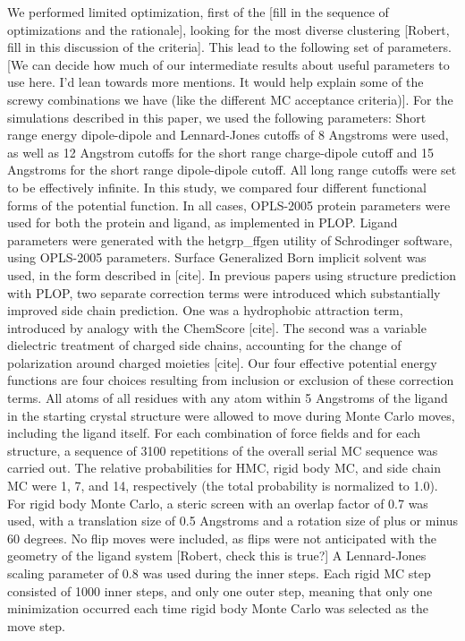 We performed limited optimization, first of the [fill in the sequence of optimizations and the rationale], looking for the most diverse clustering [Robert, fill in this discussion of the criteria].
This lead to the following set of parameters.
[We can decide how much of our intermediate results about useful parameters to use here.
I'd lean towards more mentions.
It would help explain some of the screwy combinations we have (like the different MC acceptance criteria)].
For the simulations described in this paper, we used the following parameters: Short range energy dipole-dipole and Lennard-Jones cutoffs of 8 Angstroms were used, as well as 12 Angstrom cutoffs for the short range charge-dipole cutoff and 15 Angstroms for the short range dipole-dipole cutoff.
All long range cutoffs were set to be effectively infinite.
In this study, we compared four different functional forms of the potential function.
In all cases, OPLS-2005 protein parameters were used for both the protein and ligand, as implemented in PLOP.
Ligand parameters were generated with the hetgrp\_ffgen utility of Schrodinger software, using OPLS-2005 parameters.
Surface Generalized Born implicit solvent was used, in the form described in [cite].
In previous papers using structure prediction with PLOP, two separate correction terms were introduced which substantially improved side chain prediction.
One was a hydrophobic attraction term, introduced by analogy with the ChemScore [cite].
The second was a variable dielectric treatment of charged side chains, accounting for the change of polarization around charged moieties [cite].
Our four effective potential energy functions are four choices resulting from inclusion or exclusion of these correction terms.
All atoms of all residues with any atom within 5 Angstroms of the ligand in the starting crystal structure were allowed to move during Monte Carlo moves, including the ligand itself.
For each combination of force fields and for each structure, a sequence of 3100 repetitions of the overall serial MC sequence was carried out.
The relative probabilities for HMC, rigid body MC, and side chain MC were 1, 7, and 14, respectively (the total probability is normalized to 1.0).
For rigid body Monte Carlo, a steric screen with an overlap factor of 0.7 was used, with a translation size of 0.5 Angstroms and a rotation size of plus or minus 60 degrees.
No flip moves were included, as flips were not anticipated with the geometry of the ligand system [Robert, check this is true?] A Lennard-Jones scaling parameter of 0.8 was used during the inner steps.
Each rigid MC step consisted of 1000 inner steps, and only one outer step, meaning that only one minimization occurred each time rigid body Monte Carlo was selected as the move step.
